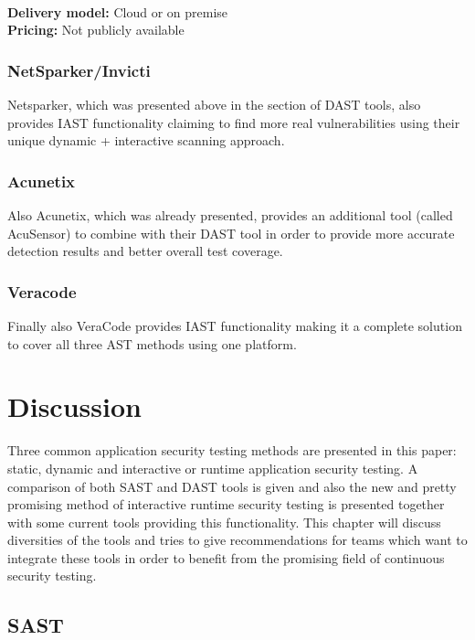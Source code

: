 \documentclass[conference]{IEEEtran}
\begin{document}
\noindent\\
\textbf{Delivery model:} Cloud or on premise
\noindent\\
\textbf{Pricing:} Not publicly available
\\


\subsubsection{NetSparker/Invicti \cite{dast1}}

Netsparker, which was presented above in the section of DAST tools, also provides IAST functionality claiming to find more real vulnerabilities using their unique dynamic + interactive scanning approach.\\

\subsubsection{Acunetix \cite{dast2}}

Also Acunetix, which was already presented, provides an additional tool (called AcuSensor) to combine with their DAST tool in order to provide more accurate detection results and better overall test coverage.\\

\subsubsection{Veracode \cite{dast7}}

Finally also VeraCode provides IAST functionality making it a complete solution to cover all three AST methods using one platform.

\section{Discussion}

Three common application security testing methods are presented in this paper: static, dynamic and interactive or runtime application security testing. A comparison of both SAST and DAST tools is given and also the new and pretty promising method of interactive runtime security testing is presented together with some current tools providing this functionality. This chapter will discuss diversities of the tools and tries to give recommendations for teams which want to integrate these tools in order to benefit from the promising field of continuous security testing.

\subsection{SAST}
\end{document}
